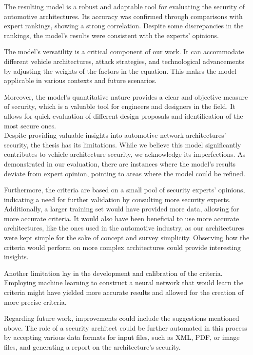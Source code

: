 The resulting model is a robust and adaptable tool for evaluating the security of automotive architectures. 
Its accuracy was confirmed through comparisons with expert rankings, showing a strong correlation. 
Despite some discrepancies in the rankings, the model's results were consistent with the experts' opinions.

The model's versatility is a critical component of our work. 
It can accommodate different vehicle architectures, attack strategies, 
and technological advancements by adjusting the weights of the factors in the equation. 
This makes the model applicable in various contexts and future scenarios.

Moreover, the model's quantitative nature provides a clear and objective measure of security, 
which is a valuable tool for engineers and designers in the field. 
It allows for quick evaluation of different design proposals and identification of the most secure ones.\\

Despite providing valuable insights into automotive network architectures' security, the thesis has its limitations.
While we believe this model significantly contributes to vehicle architecture security, we acknowledge its imperfections. 
As demonstrated in our evaluation, there are instances where the model's results deviate from expert opinion, 
pointing to areas where the model could be refined.

Furthermore, the criteria are based on a small pool of security experts' opinions, 
indicating a need for further validation by consulting more security experts. 
Additionally, a larger training set would have provided more data, allowing for more accurate criteria. 
It would also have been beneficial to use more accurate architectures, like the ones used in the automotive industry, 
as our architectures were kept simple for the sake of concept and survey simplicity. 
Observing how the criteria would perform on more complex architectures could provide interesting insights.

Another limitation lay in the development and calibration of the criteria. 
Employing machine learning to construct a neural network that would learn the criteria might have 
yielded more accurate results and allowed for the creation of more precise criteria.

Regarding future work, improvements could include the suggestions mentioned above. 
The role of a security architect could be further automated in this process by accepting various data formats for input files, 
such as XML, PDF, or image files, and generating a report on the architecture's security.\\

